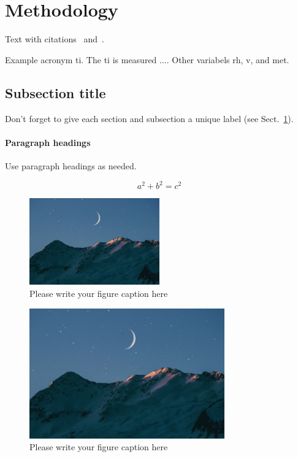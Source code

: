 
\section{Methodology}\label{sec:methodology}
Text with citations~\cite{Tartarini2020a} and~\cite{Tartarini2020}.

Example acronym \ac{ti}.
The \ac{ti} is measured ....
Other variabels \ac{rh}, \ac{v}, and \ac{met}.

\subsection{Subsection title}\label{subsec:2}
Don't forget to give each section
and subsection a unique label (see Sect.~\ref{sec:methodology}).

\paragraph{Paragraph headings} Use paragraph headings as needed.

\begin{equation}
a^2+b^2=c^2\label{eq:equation}
\end{equation}

\begin{figure}
  \centering
  \includegraphics[width=0.5\textwidth]{figures/moon}
  \caption{Please write your figure caption here}
  \label{fig:1}       %
\end{figure}

\begin{figure}
  \centering
  \includegraphics[width=0.75\textwidth]{figures/moon}
  \caption{Please write your figure caption here}
  \label{fig:2}       %
\end{figure}

